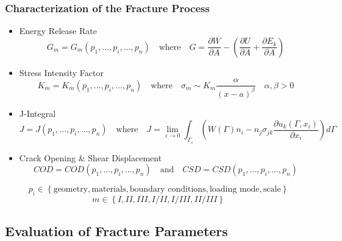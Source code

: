 \documentclass[first,firstsupp,lastsupp,handout,last,hyperref,table]{ETHclass}
\begin{document}
\begin{frame}
\frametitle{\small Characterization of the Fracture Process}
\vspace{-0.25cm}
\centering
\scriptsize
\begin{itemize}[label=]
\item Energy Release Rate
\begin{equation*}
G_{m}=G_{m}\left(p_{1},\dots,p_{i},\dots,p_{n}\right)\quad\text{where}\quad G=\frac{\partial W}{\partial A} - \left(\frac{\partial U}{\partial A}+\frac{\partial E_{k}}{\partial A}\right)
\end{equation*}
\item Stress Intensity Factor
\begin{equation*}
K_{m}=K_{m}\left(p_{1},\dots,p_{i},\dots,p_{n}\right)\quad\text{where}\quad \sigma_{m}\sim K_{m}\frac{\alpha}{\left(x-a\right)^{\beta}}\quad\alpha,\beta>0
\end{equation*}
\item J-Integral
\begin{equation*}
J=J\left(p_{1},\dots,p_{i},\dots,p_{n}\right)\quad\text{where}\quad J=\lim_{\varepsilon\to 0}\int_{\Gamma_{\varepsilon}}\left(W\left(\Gamma\right)n_{i}-n_{j}\sigma_{jk}\frac{\partial u_{k}\left(\Gamma,x_{i}\right)}{\partial x_{i}}\right)d\Gamma
\end{equation*}
\item Crack Opening \& Shear Displacement
\begin{equation*}
COD=COD\left(p_{1},\dots,p_{i},\dots,p_{n}\right)\quad\text{and}\quad CSD=CSD\left(p_{1},\dots,p_{i},\dots,p_{n}\right)
\end{equation*}
\end{itemize}
\vspace{5pt}
\begin{equation*}
p_{i}\in\left\{\text{geometry},\text{materials},\text{boundary conditions},\text{loading mode},\text{scale}\right\}
\end{equation*}
\begin{equation*}
m\in\left\{I,II,III,I/II,I/III,II/III\right\}
\end{equation*}
\end{frame}

\subsection[Evaluation  of Fracture Parameters]{Evaluation of Fracture Parameters}
\end{document}
